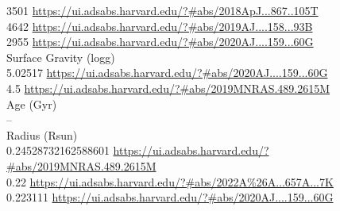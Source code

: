 3501 \url{https://ui.adsabs.harvard.edu/?#abs/2018ApJ...867..105T}\\
4642 \url{https://ui.adsabs.harvard.edu/?#abs/2019AJ....158...93B}\\
2955 \url{https://ui.adsabs.harvard.edu/?#abs/2020AJ....159...60G}\\
Surface Gravity (logg) \\
5.02517 \url{https://ui.adsabs.harvard.edu/?#abs/2020AJ....159...60G}\\
4.5 \url{https://ui.adsabs.harvard.edu/?#abs/2019MNRAS.489.2615M}\\
Age (Gyr)\\
--\\
Radius (Rsun)\\
0.24528732162588601 \url{https://ui.adsabs.harvard.edu/?#abs/2019MNRAS.489.2615M}\\
0.22 \url{https://ui.adsabs.harvard.edu/?#abs/2022A%26A...657A...7K}\\
0.223111 \url{https://ui.adsabs.harvard.edu/?#abs/2020AJ....159...60G}\\